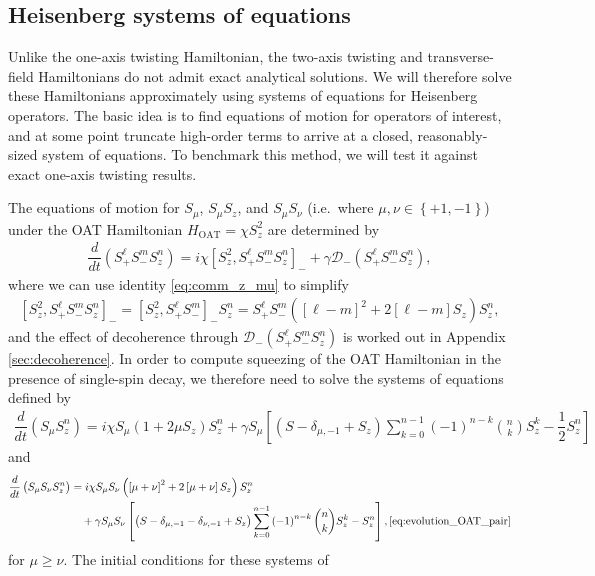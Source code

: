 \documentclass[aps,notitlepage,nofootinbib,11pt]{revtex4-1}
\renewcommand{\t}{\text} %
\newcommand{\f}[2]{\dfrac{#1}{#2}} %
\newcommand{\p}[1]{\left(#1\right)} %
\renewcommand{\sp}[1]{\left[#1\right]} %
\renewcommand{\set}[1]{\left\{#1\right\}} %
\newcommand{\D}{\mathcal{D}}
\newcommand{\1}{\mathds{1}}
\begin{document}
\subsection{Heisenberg systems of equations}

Unlike the one-axis twisting Hamiltonian, the two-axis twisting and
transverse-field Hamiltonians do not admit exact analytical
solutions. We will therefore solve these Hamiltonians approximately
using systems of equations for Heisenberg operators.  The basic idea
is to find equations of motion for operators of interest, and at some
point truncate high-order terms to arrive at a closed,
reasonably-sized system of equations.  To benchmark this method, we
will test it against exact one-axis twisting results.

The equations of motion for $S_\mu$, $S_\mu S_z$, and $S_\mu S_\nu$
(i.e.~where $\mu,\nu\in\set{+1,-1}$) under the OAT Hamiltonian
$H_{\t{OAT}}=\chi S_z^2$ are determined by
\begin{align}
  \f{d}{dt} \p{S_+^\ell S_-^m S_z^n}
  = i\chi \sp{S_z^2, S_+^\ell S_-^m S_z^n}_-
  + \gamma \D_-\p{S_+^\ell S_-^m S_z^n},
\end{align}
where we can use identity \eqref{eq:comm_z_mu} to simplify
\begin{align}
  \sp{S_z^2, S_+^\ell S_-^m S_z^n}_-
  = \sp{S_z^2, S_+^\ell S_-^m}_- S_z^n
  = S_+^\ell S_-^m \p{\sp{\ell-m}^2 + 2\sp{\ell-m} S_z} S_z^n,
  \label{eq:S_z^2_comm}
\end{align}
and the effect of decoherence through $\D_-\p{S_+^\ell S_-^m S_z^n}$ is
worked out in Appendix \ref{sec:decoherence}.  In order to compute
squeezing of the OAT Hamiltonian in the presence of single-spin decay,
we therefore need to solve the systems of equations defined by
\begin{align}
  \f{d}{dt} \p{S_\mu S_z^n}
  = i\chi S_\mu \p{1 + 2\mu S_z} S_z^n
  + \gamma S_\mu \sp{\p{S - \delta_{\mu,-1} + S_z} \sum_{k=0}^{n-1}
    \p{-1}^{n-k} { n \choose k } S_z^k - \f12 S_z^n}
  \label{eq:evolution_OAT_single}
\end{align}
and
\begin{align}
  \f{d}{dt} \p{S_\mu S_\nu S_z^n}
  &= i\chi S_\mu S_\nu \p{\sp{\mu+\nu}^2 + 2 \sp{\mu+\nu} S_z} S_z^n
  \tag*{} \\
  &\quad + \gamma S_\mu S_\nu
  \sp{\p{S - \delta_{\mu,-1} - \delta_{\nu,-1} + S_z} \sum_{k=0}^{n-1}
    \p{-1}^{n-k} { n \choose k } S_z^k - S_z^n},
  \eqref{eq:evolution_OAT_pair}
\end{align}
for $\mu\ge\nu$.  The initial conditions for these systems of
\end{document}

